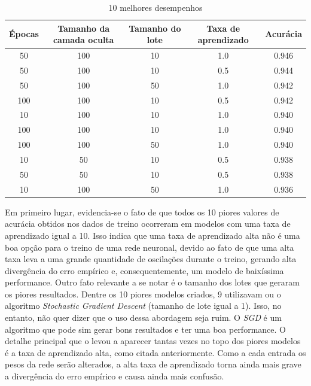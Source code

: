 \documentclass{article}
\begin{document}
\begin{table}[H]
    \centering
        \captionsetup{labelformat=empty} 
        \caption{10 melhores desempenhos}
        \begin{tabular}{| c c c c c |}
        \hline
        Épocas & Tamanho da camada oculta & Tamanho do lote & Taxa de aprendizado & Acurácia \\
        \hline
            50 & 100 & 10 & 1.0 & 0.946 \\
            50 & 100 & 10 & 0.5 & 0.944 \\
            50 & 100 & 50 & 1.0 & 0.942 \\
            100 & 100 & 10 & 0.5 & 0.942 \\
            10 & 100 & 10 & 1.0 & 0.940 \\
            100 & 100 & 10 & 1.0 & 0.940 \\
            100 & 100 & 50 & 1.0 & 0.940 \\
            10 &  50 & 10 & 0.5 & 0.938 \\
            50 &  50 & 10 & 0.5 & 0.938 \\
            10 & 100 & 50 & 1.0 & 0.936 \\
        \hline
        \end{tabular}
\end{table}

Em primeiro lugar, evidencia-se o fato de que todos os 10 piores valores de acurácia obtidos nos dados de treino ocorreram em modelos com uma taxa de aprendizado igual a 10. Isso indica que uma taxa de aprendizado alta não é uma boa opção para o treino de uma rede neuronal, devido ao fato de que uma alta taxa leva a uma grande quantidade de oscilações durante o treino, gerando alta divergência do erro empírico e, consequentemente, um modelo de baixíssima performance.
Outro fato relevante a se notar é o tamanho dos lotes que geraram os piores resultados. Dentre os 10 piores modelos criados, 9 utilizavam ou o algoritmo \textit{Stochastic Gradient Descent} (tamanho de lote igual a 1). Isso, no entanto, não quer dizer que o uso dessa abordagem seja ruim. O \textit{SGD} é um algoritmo que pode sim gerar bons resultados e ter uma boa performance. O detalhe principal que o levou a aparecer tantas vezes no topo dos piores modelos é a taxa de aprendizado alta, como citada anteriormente. Como a cada entrada os pesos da rede serão alterados, a alta taxa de aprendizado torna ainda mais grave a divergência do erro empírico e causa ainda mais confusão.
\end{document}
